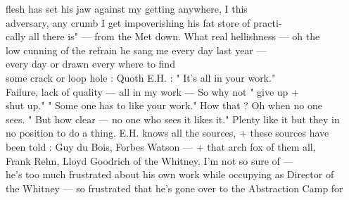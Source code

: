 \documentclass[11pt,a4paper]{article}
\begin{document}
{flesh has set his jaw against my getting anywhere, I this \\
adversary, any crumb I get impoverishing his fat store of practi- \\
cally all there is" --- from the Met down. What real hellishness --- oh the \\
low cunning of the refrain he sang me every day last year --- \\
every day  or drawn every where to find \\
some crack or loop hole : Quoth E.H. : " It's all in your work." \\
Failure, lack of quality --- all in my work --- So why not " give up + \\
shut up." " Some one has to like your work." How that ? Oh when no one \\
sees. " But how clear --- no one who sees it likes it." Plenty like it but they in \\
no position to do a thing. E.H. knows all the sources, + these sources have \\
been told : Guy du Bois, Forbes Watson --- + that arch  fox of them all, \\
Frank Rehn, Lloyd Goodrich of the Whitney. I'm not so sure of  --- \\
he's too much frustrated about his own work while occupying as Director of \\
the Whitney --- so frustrated that he's gone over to the Abstraction Camp for}


\end{document}
